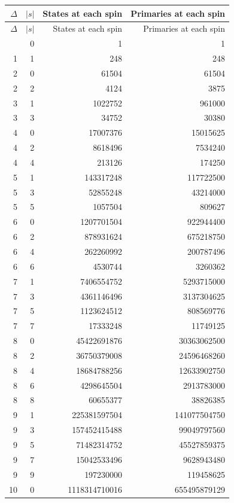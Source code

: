 \begingroup\footnotesize
\setlength{\tabcolsep}{5pt}
\begin{longtable}{@{}rrrr@{}}
\toprule
$\Delta$ & $|s|$ & States at each spin & Primaries at each spin\\
\midrule\endfirsthead
\toprule
$\Delta$ & $|s|$ & States at each spin & Primaries at each spin\\
\midrule\endhead
\bottomrule\endfoot
0 & 0 & 1 & 1\\
1 & 1 & 248 & 248\\
2 & 0 & 61504 & 61504\\
2 & 2 & 4124 & 3875\\
3 & 1 & 1022752 & 961000\\
3 & 3 & 34752 & 30380\\
4 & 0 & 17007376 & 15015625\\
4 & 2 & 8618496 & 7534240\\
4 & 4 & 213126 & 174250\\
5 & 1 & 143317248 & 117722500\\
5 & 3 & 52855248 & 43214000\\
5 & 5 & 1057504 & 809627\\
6 & 0 & 1207701504 & 922944400\\
6 & 2 & 878931624 & 675218750\\
6 & 4 & 262260992 & 200787496\\
6 & 6 & 4530744 & 3260362\\
7 & 1 & 7406554752 & 5293715000\\
7 & 3 & 4361146496 & 3137304625\\
7 & 5 & 1123624512 & 808569776\\
7 & 7 & 17333248 & 11749125\\
8 & 0 & 45422691876 & 30363062500\\
8 & 2 & 36750379008 & 24596468260\\
8 & 4 & 18684788256 & 12633902750\\
8 & 6 & 4298645504 & 2913783000\\
8 & 8 & 60655377 & 38826385\\
9 & 1 & 225381597504 & 141077504750\\
9 & 3 & 157452415488 & 99049797560\\
9 & 5 & 71482314752 & 45527859375\\
9 & 7 & 15042533496 & 9628943480\\
9 & 9 & 197230000 & 119458625\\
10 & 0 & 1118314710016 & 655495879129\\

\end{longtable}
